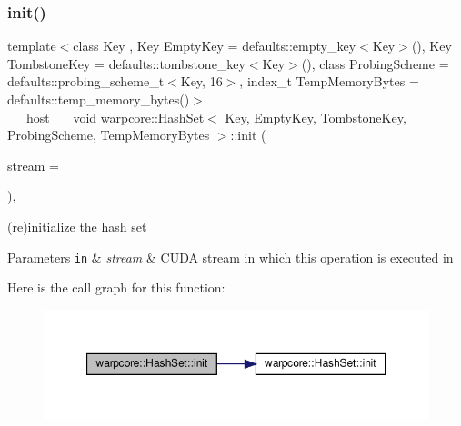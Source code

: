 \subsubsection{\texorpdfstring{init()}{init()}\hspace{0.1cm}{\footnotesize\ttfamily [2/2]}}
{\footnotesize\ttfamily template$<$class Key , Key Empty\+Key = defaults\+::empty\+\_\+key$<$\+Key$>$(), Key Tombstone\+Key = defaults\+::tombstone\+\_\+key$<$\+Key$>$(), class Probing\+Scheme  = defaults\+::probing\+\_\+scheme\+\_\+t$<$\+Key, 16$>$, index\+\_\+t Temp\+Memory\+Bytes = defaults\+::temp\+\_\+memory\+\_\+bytes()$>$ \\
\+\_\+\+\_\+host\+\_\+\+\_\+ void \hyperlink{classwarpcore_1_1HashSet}{warpcore\+::\+Hash\+Set}$<$ Key, Empty\+Key, Tombstone\+Key, Probing\+Scheme, Temp\+Memory\+Bytes $>$\+::init (\begin{DoxyParamCaption}\item[{const cuda\+Stream\+\_\+t}]{stream = {} }\end{DoxyParamCaption})\hspace{0.3cm}{\ttfamily [inline]}, {\ttfamily [noexcept]}}



(re)initialize the hash set 


\begin{DoxyParams}[1]{Parameters}
\mbox{\tt in}  & {\em stream} & C\+U\+DA stream in which this operation is executed in \\
\hline
\end{DoxyParams}
Here is the call graph for this function\+:
\nopagebreak
\begin{figure}[H]
\begin{center}
\leavevmode
\includegraphics[width=350pt]{classwarpcore_1_1HashSet_ae21bfb96f28d7b097841d6a6874c16d5_cgraph}
\end{center}
\end{figure}
\mbox{\label{classwarpcore_1_1HashSet_af54d9aecfefb13e451e0580a38702f54}} 
